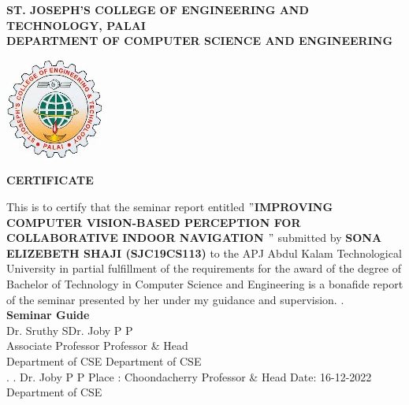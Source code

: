 \newpage
\thispagestyle{empty}
\begin{center}
\normalsize{\bf{ST. JOSEPH’S COLLEGE OF ENGINEERING AND TECHNOLOGY, PALAI}}\\[0.5cm]
\normalsize
 {\bf{ DEPARTMENT OF COMPUTER SCIENCE AND ENGINEERING}}\\[1.0cm]%
   \begin{center}
   \includegraphics{SJCET_logo.jpg}
   \end{center}
{\large \bf{CERTIFICATE}}\\[1.5cm]
\end{center}
\normalsize 
This is to certify that the seminar report entitled {\bf $ "$IMPROVING COMPUTER VISION-BASED PERCEPTION FOR COLLABORATIVE INDOOR NAVIGATION $"$} submitted by { \bf SONA ELIZEBETH SHAJI (SJC19CS113)} to the APJ Abdul
Kalam Technological University in partial fulfillment of the requirements for the award of
the degree of Bachelor of Technology in Computer Science and Engineering is a bonafide
report of the seminar presented by her under my guidance and supervision. .\vspace{1.3 cm}\\
{\bf Seminar Guide}\hspace{8.4 cm}{\bf Seminar Coordinator}\\
Dr. Sruthy S\hspace{9.0 cm}Dr. Joby P P\\ Associate Professor\hspace{7.7cm} Professor \& Head\\Department of CSE\hspace{7.7 cm} Department of CSE\
\vspace{1.3 cm}\\
.\hspace{11.00 cm}{ \bf Head of the Department}
\newline
.\hspace{11.0 cm} Dr. Joby P P
\newline
Place : Choondacherry  \hspace{7.15 cm} Professor \& Head
\newline
Date\hspace{0.25 cm}: 16-12-2022\hspace{7.85 cm} Department of CSE
                



